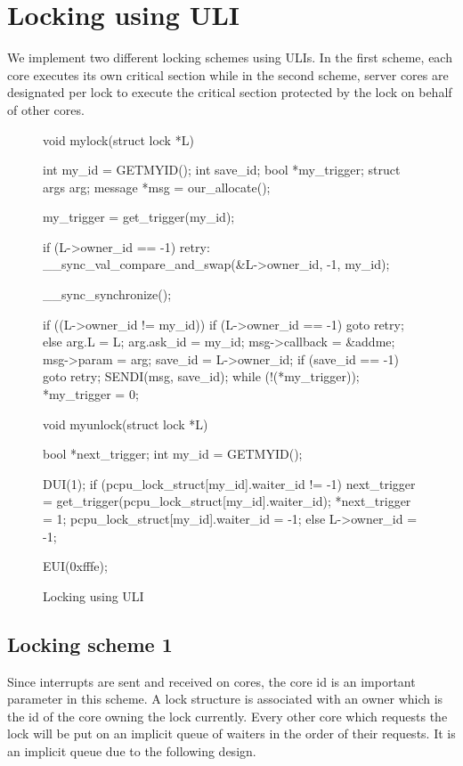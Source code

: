 \section{Locking using ULI}

We implement two different locking schemes using ULIs. In the first scheme, each
core executes its own critical section while in the second scheme, server cores
are designated per lock to execute the critical section protected by the lock on
behalf of other cores.

\begin{figure}
\begin{code} 
void mylock(struct lock *L)
{
    int my_id  = GETMYID();
    int save_id;
    bool *my_trigger;
    struct args arg;
    message *msg = our_allocate();

    my_trigger = get_trigger(my_id);

    if (L->owner_id == -1)
retry:
        __sync_val_compare_and_swap(&L->owner_id, -1, my_id);

    __sync_synchronize();

    if ((L->owner_id != my_id)) {
        if (L->owner_id == -1) {
            goto retry;
        } else {
            arg.L = L;
            arg.ask_id = my_id;
            msg->callback = &addme;
            msg->param = arg;
            save_id = L->owner_id;
            if (save_id == -1)
                goto retry;
            SENDI(msg, save_id);
            while (!(*my_trigger));
        }
    }
    *my_trigger = 0;
}

void myunlock(struct lock *L)
{
    bool *next_trigger;
    int my_id = GETMYID();

    DUI(1);
    if (pcpu_lock_struct[my_id].waiter_id != -1) {
        next_trigger = get_trigger(pcpu_lock_struct[my_id].waiter_id);
        *next_trigger = 1;
        pcpu_lock_struct[my_id].waiter_id = -1;
    } else {
        L->owner_id = -1;
    }

    EUI(0xfffe);
}
\end{code}
\caption{Locking using ULI\label{fig-locking}}
\end{figure}

\subsection{Locking scheme 1}

Since interrupts are sent and received on cores, the core id is an important
parameter in this scheme. A lock structure is associated with an owner which is
the id of the core owning the lock currently. Every other core which requests
the lock will be put on an implicit queue of waiters in the order of their
requests. It is an implicit queue due to the following design.


